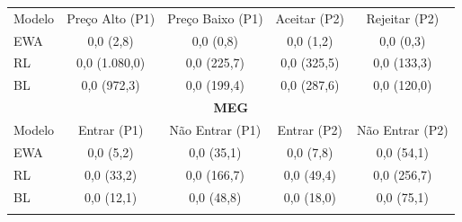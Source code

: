 \begin{tabela}[H]
\small
\centering
\caption{Probabilidade média (valor principal) com estatística complementar (entre parênteses)}
\begin{tabular}{l|c c c c}
\Xhline{2\arrayrulewidth}
\multicolumn{5}{c}{\textbf{BSG}} \\ \hline
Modelo & Preço Alto (P1) & Preço Baixo (P1) & Aceitar (P2) & Rejeitar (P2) \\ \hline
EWA & 0,0 (2,8) & 0,0 (0,8) & 0,0 (1,2) & 0,0 (0,3) \\
RL & 0,0 (1.080,0) & 0,0 (225,7) & 0,0 (325,5) & 0,0 (133,3) \\
BL & 0,0 (972,3) & 0,0 (199,4) & 0,0 (287,6) & 0,0 (120,0) \\ 
\hline
\multicolumn{5}{c}{\textbf{MEG}} \\ \hline
Modelo & Entrar (P1) & Não Entrar (P1) & Entrar (P2) & Não Entrar (P2) \\ \hline
EWA & 0,0 (5,2) & 0,0 (35,1) & 0,0 (7,8) & 0,0 (54,1) \\
RL & 0,0 (33,2) & 0,0 (166,7) & 0,0 (49,4) & 0,0 (256,7) \\
BL & 0,0 (12,1) & 0,0 (48,8) & 0,0 (18,0) & 0,0 (75,1) \\ 
\Xhline{2\arrayrulewidth}
\end{tabular}
\label{tabela_9}
\caption*{\fontsize{10}{12}\selectfont Fonte: Elaborado pelo autor (2024).}
\end{tabela}
